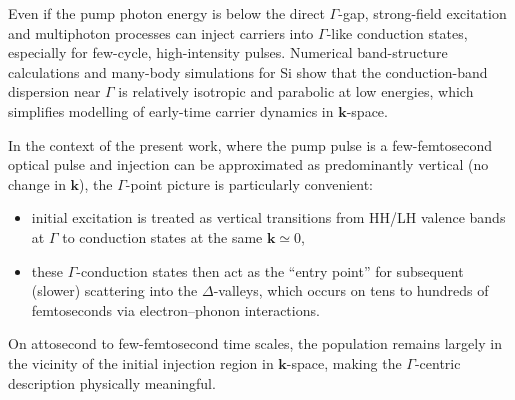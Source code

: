 Even if the pump photon energy is below the direct $\Gamma$-gap, strong-field excitation and multiphoton processes can inject carriers into $\Gamma$-like conduction states, especially for few-cycle, high-intensity pulses.
Numerical band-structure calculations and many-body simulations for Si show that the conduction-band dispersion near $\Gamma$ is relatively isotropic and parabolic at low energies, which simplifies modelling of early-time carrier dynamics in $\mathbf k$-space.\cite{WessnerSiBand,QuantumATKSi}

In the context of the present work, where the pump pulse is a few-femtosecond optical pulse and injection can be approximated as predominantly vertical (no change in $\mathbf k$), the $\Gamma$-point picture is particularly convenient:
\begin{itemize}
  \item initial excitation is treated as vertical transitions from HH/LH valence bands at $\Gamma$ to conduction states at the same $\mathbf k\simeq 0$,
  \item these $\Gamma$-conduction states then act as the ``entry point'' for subsequent (slower) scattering into the $\Delta$-valleys, which occurs on tens to hundreds of femtoseconds via electron--phonon interactions.\cite{Bernardi2014,Marini2013}
\end{itemize}
On attosecond to few-femtosecond time scales, the population remains largely in the vicinity of the initial injection region in $\mathbf k$-space, making the $\Gamma$-centric description physically meaningful.\cite{Schultze2014}



